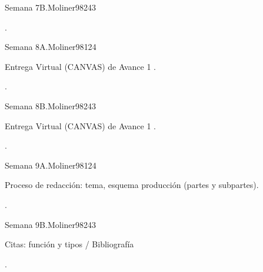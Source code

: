 \begin{syllabus}
\begin{unit}{}{Semana 7B.}{Moliner98}{24}{3}
   \begin{learningoutcomes}
      \item . 
      \end{learningoutcomes}
\end{unit}

\begin{unit}{}{Semana 8A.}{Moliner98}{12}{4}
   \begin{topics}
      \item Entrega Virtual (CANVAS) de Avance 1 .
   \end{topics}
   \begin{learningoutcomes}
      \item .
   \end{learningoutcomes}
\end{unit}

\begin{unit}{}{Semana 8B.}{Moliner98}{24}{3}
   \begin{topics}
      \item Entrega Virtual (CANVAS) de Avance 1 .
   \end{topics}

   \begin{learningoutcomes}
      \item .
      \end{learningoutcomes}
\end{unit}

\begin{unit}{}{Semana 9A.}{Moliner98}{12}{4}
   \begin{topics}
      \item Proceso de redacción: tema, esquema producción (partes y subpartes).
   \end{topics}
   \begin{learningoutcomes}
      \item .
   \end{learningoutcomes}
\end{unit}

\begin{unit}{}{Semana 9B.}{Moliner98}{24}{3}
   \begin{topics}
      \item Citas: función y tipos / Bibliografía 
   \end{topics}

   \begin{learningoutcomes}
      \item .
      \end{learningoutcomes}
\end{unit}


\end{syllabus}
